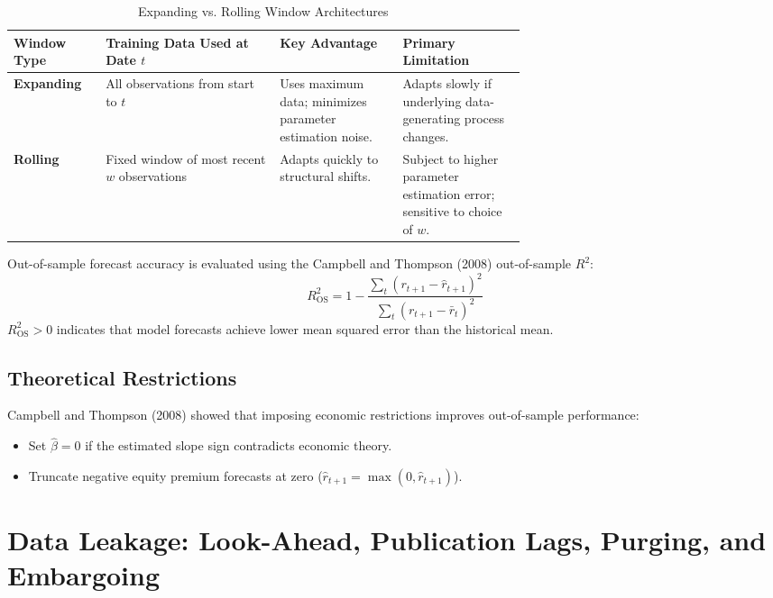 \begin{table}[htbp]
\centering
\small
\caption{Expanding vs. Rolling Window Architectures}
\label{tab:05-windows}
\begin{tabularx}{0.95\linewidth}{@{}>{\raggedright\arraybackslash}p{0.18\linewidth}>{\raggedright\arraybackslash}X>{\raggedright\arraybackslash}p{0.24\linewidth}>{\raggedright\arraybackslash}p{0.24\linewidth}@{}}
\toprule
Window Type & Training Data Used at Date $t$ & Key Advantage & Primary Limitation \\
\midrule
\textbf{Expanding} & All observations from start to $t$ & Uses maximum data; minimizes parameter estimation noise. & Adapts slowly if underlying data-generating process changes. \\
\textbf{Rolling} & Fixed window of most recent $w$ observations & Adapts quickly to structural shifts. & Subject to higher parameter estimation error; sensitive to choice of $w$. \\
\bottomrule
\end{tabularx}
\end{table}

Out-of-sample forecast accuracy is evaluated using the Campbell and Thompson (2008) out-of-sample $R^2$:
\begin{equation}
  R^2_{\text{OS}} = 1 - \frac{\sum_{t} \left( r_{t+1} - \hat{r}_{t+1} \right)^2}{\sum_{t} \left( r_{t+1} - \bar{r}_t \right)^2}
  \label{eq:05-r2os}
\end{equation}
$R^2_{\text{OS}} > 0$ indicates that model forecasts achieve lower mean squared error than the historical mean.

\subsection{Theoretical Restrictions}
Campbell and Thompson (2008) showed that imposing economic restrictions improves out-of-sample performance:
\begin{itemize}
  \item Set $\hat{\beta} = 0$ if the estimated slope sign contradicts economic theory.
  \item Truncate negative equity premium forecasts at zero ($\hat{r}_{t+1} = \max(0, \hat{r}_{t+1})$).
\end{itemize}

\section{Data Leakage: Look-Ahead, Publication Lags, Purging, and Embargoing}
\label{sec:05-leakage}


